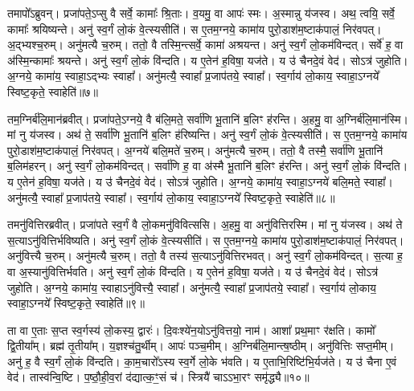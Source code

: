    तमापो᳚ऽब्रुवन्।
   प्रजा॑पते॒ऽप्सु वै सर्वे॒ कामाः᳚ श्रि॒ताः।
   व॒यमु॒ वा आपः॑ स्मः।
   अ॒स्मान्नु य॑जस्व।
   अथ॒ त्वयि॒ सर्वे॒ कामाः᳚ श्रयिष्यन्ते।
   अनु॑ स्व॒र्गं लो॒कं वे॒त्स्यसीति॑।
   स ए॒तम॒ग्नये॒ कामा॑य पुरो॒डाश॑म॒ष्टाक॑पालं॒ निर॑वपत्।
   अ॒द्भ्यश्च॒रुम्।
   अनु॑मत्यै च॒रुम्।
   ततो॒ वै तस्मि॒न्त्सर्वे॒ कामा॑ अश्रयन्त।
   अनु॑ स्व॒र्गं लो॒कम॑विन्दत्।
   सर्वे॑ ह॒ वा अ॑स्मि॒न्कामाः᳚ श्रयन्ते।
   अनु॑ स्व॒र्गं लो॒कं वि॑न्दति।
   य ए॒तेन॑ ह॒विषा॒ यज॑ते।
   य उ॑ चैनदे॒वं वेद॑।
   सोऽत्र॑ जुहोति।
   अ॒ग्नये॒ कामा॑य॒ स्वाहा॒ऽद्भ्यः स्वाहा᳚।
   अनु॑मत्यै॒ स्वाहा᳚ प्र॒जाप॑तये॒ स्वाहा᳚।
   स्व॒र्गाय॑ लो॒काय॒ स्वाहा॒ऽग्नये᳚ स्विष्ट॒कृते॒ स्वाहेति॑॥७॥

   तम॒ग्निर्ब॑लि॒मान॑ब्रवीत्।
   प्रजा॑पते॒ऽग्नये॒ वै ब॑लि॒मते॒ सर्वा॑णि भू॒तानि॑ ब॒लिꣳ ह॑रन्ति।
   अ॒हमु॒ वा अ॒ग्निर्ब॑लि॒मान॑स्मि।
   मां नु य॑जस्व।
   अथ॑ ते॒ सर्वा॑णि भू॒तानि॑ ब॒लिꣳ ह॑रिष्यन्ति।
   अनु॑ स्व॒र्गं लो॒कं वे॒त्स्यसीति॑।
   स ए॒तम॒ग्नये॒ कामा॑य पुरो॒डाश॑म॒ष्टाक॑पालं॒ निर॑वपत्।
   अ॒ग्नये॑ बलि॒मते॑ च॒रुम्।
   अनु॑मत्यै च॒रुम्।
   ततो॒ वै तस्मै॒ सर्वा॑णि भू॒तानि॑ ब॒लिम॑हरन्।
   अनु॑ स्व॒र्गं लो॒कम॑विन्दत्।
   सर्वा॑णि ह॒ वा अ॑स्मै भू॒तानि॑ ब॒लिꣳ ह॑रन्ति।
   अनु॑ स्व॒र्गं लो॒कं वि॑न्दति।
   य ए॒तेन॑ ह॒विषा॒ यज॑ते।
   य उ॑ चैनदे॒वं वेद॑।
   सोऽत्र॑ जुहोति।
   अ॒ग्नये॒ कामा॑य॒ स्वाहा॒ऽग्नये॑ बलि॒मते॒ स्वाहा᳚।
   अनु॑मत्यै॒ स्वाहा᳚ प्र॒जाप॑तये॒ स्वाहा᳚।
   स्व॒र्गाय॑ लो॒काय॒ स्वाहा॒ऽग्नये᳚ स्विष्ट॒कृते॒ स्वाहेति॑॥८॥

   तमनु॑वित्तिरब्रवीत्।
   प्रजा॑पते स्व॒र्गं वै लो॒कमनु॑विवित्ससि।
   अ॒हमु॒ वा अनु॑वित्तिरस्मि।
   मां नु य॑जस्व।
   अथ॑ ते स॒त्याऽनु॑वित्तिर्भविष्यति।
   अनु॑ स्व॒र्गं लो॒कं वे॒त्स्यसीति॑।
   स ए॒तम॒ग्नये॒ कामा॑य पुरो॒डाश॑म॒ष्टाक॑पालं॒ निर॑वपत्।
   अनु॑वित्त्यै च॒रुम्।
   अनु॑मत्यै च॒रुम्।
   ततो॒ वै तस्य॑ स॒त्याऽनु॑वित्तिरभवत्।
   अनु॑ स्व॒र्गं लो॒कम॑विन्दत्।
   स॒त्या ह॒ वा अ॒स्यानु॑वित्तिर्भवति।
   अनु॑ स्व॒र्गं लो॒कं वि॑न्दति।
   य ए॒तेन॑ ह॒विषा॒ यज॑ते।
   य उ॑ चैनदे॒वं वेद॑।
   सोऽत्र॑ जुहोति।
   अ॒ग्नये॒ कामा॑य॒ स्वाहाऽनु॑वित्त्यै॒ स्वाहा᳚।
   अनु॑मत्यै॒ स्वाहा᳚ प्र॒जाप॑तये॒ स्वाहा᳚।
   स्व॒र्गाय॑ लो॒काय॒ स्वाहा॒ऽग्नये᳚ स्विष्ट॒कृते॒ स्वाहेति॑॥९॥

   ता वा ए॒ताः स॒प्त स्व॒र्गस्य॑ लो॒कस्य॒ द्वारः॑।
   दि॒वःश्ये॑न॒योऽनु॑\-वित्तयो॒ नाम॑।
   आशा᳚ प्रथ॒माꣳ र॑क्षति।
   कामो᳚ द्वि॒तीया᳚म्।
   ब्रह्म॑ तृ॒तीया᳚म्।
   य॒ज्ञश्च॑तु॒र्थीम्।
   आपः॑ पञ्च॒मीम्।
   अ॒ग्निर्ब॑लि॒मान्त्ष॒ष्ठीम्।
   अनु॑वित्तिः सप्त॒मीम्।
   अनु॑ ह॒ वै स्व॒र्गं लो॒कं वि॑न्दति।
   का॒म॒चारो᳚ऽस्य स्व॒र्गे लो॒के भ॑वति।
   य ए॒ताभि॒रिष्टि॑भि॒र्यज॑ते।
   य उ॑ चैना ए॒वं वेद॑।
   तास्व॑न्वि॒ष्टि।
   प॒ष्ठौ॒ही॒व॒रां द॑द्यात्क॒ꣳ॒सं च॑।
   स्त्रियै॑ चाऽऽभा॒रꣳ समृ॑द्ध्यै॥१०॥\anuvakamend
  
